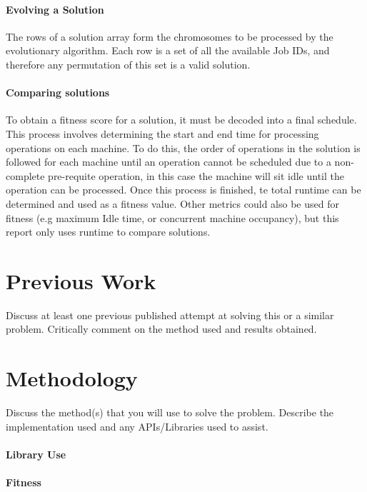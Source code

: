 \documentclass[14pt]{acmsiggraph}
\begin{document}
\paragraph{Evolving a Solution}
The rows of a solution array form the chromosomes to be processed by the evolutionary algorithm. Each row is a set of all the available Job IDs, and therefore any permutation of this set is a valid solution. 

\paragraph{Comparing solutions}
To obtain a fitness score for a solution, it must be decoded into a final schedule. This process involves determining the start and end time for processing operations on each machine. To do this, the order of operations in the solution is followed for each machine until an operation cannot be scheduled due to a non-complete pre-requite operation, in this case the machine will sit idle until the operation can be processed. Once this process is finished, te total runtime can be determined and used as a fitness value. Other metrics could also be used for fitness (e.g maximum Idle time, or concurrent machine occupancy), but this report only uses runtime to compare solutions.

\section{Previous  Work}
Discuss at least one previous published attempt at solving this or a similar problem. 
Critically comment on the method used and results obtained.
\lipsum[7]
\cite{gonzalez2013efficient}

\cite{gao2011efficient}

\cite{zhang2011effective}

\cite{driss2015effective}

\cite{wang2012new}

\section{Methodology}
Discuss the method(s) that you will use to solve the problem. 
Describe the implementation used and any APIs/Libraries used to assist.
\lipsum[7]
\paragraph{Library Use}
\paragraph{Fitness}
\end{document}
